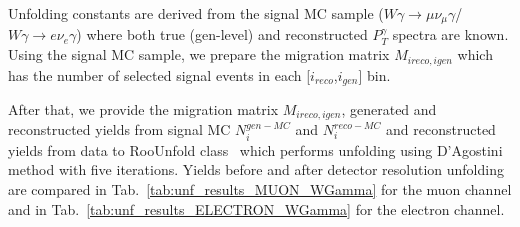
Unfolding constants are derived from the signal MC sample ($W\gamma\rightarrow\mu\nu_{\mu}\gamma$/$W\gamma\rightarrow{e}\nu_{e}\gamma$) where both true (gen-level) and reconstructed $P_T^\gamma$ spectra are known. Using the signal MC sample, we prepare the migration matrix $M_{ireco,igen}$ which has the number of selected signal events in each [$i_{reco}$,$i_{gen}$] bin. 

After that, we provide the migration matrix $M_{ireco,igen}$, generated and reconstructed yields from signal MC $N^{gen-MC}_i$ and $N^{reco-MC}_i$ and reconstructed yields from data to RooUnfold class~\cite{ref_RooUnfold} which performs unfolding using D'Agostini method with five iterations. Yields before and after detector resolution unfolding are compared in Tab.~\ref{tab:unf_results_MUON_WGamma} for the muon channel and in Tab.~\ref{tab:unf_results_ELECTRON_WGamma} for the electron channel. 

